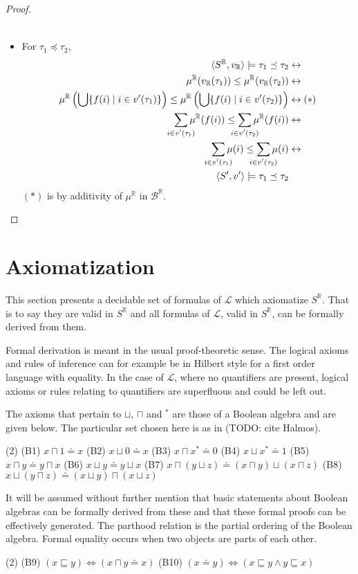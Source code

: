 \documentclass{article}
\newcommand{\R}{\mathbb{R}}
\newcommand{\B}{\mathcal{B}}
\newcommand{\lang}{\mathcal{L}}
\newcommand{\lcup}{\sqcup}
\newcommand{\lcap}{\sqcap}
\newcommand{\lstar}{^*}
\newcommand{\lpart}{\sqsubseteq}
\newcommand{\lparteq}{\doteq}
\newcommand{\lmeasure}{\preceq}
\begin{document}
\begin{proof}
\begin{itemize}
\begin{align*}
      \end{align*}
    \item For $\tau_1 \lmeasure \tau_2$,
      \begin{align*}
        \langle S^\R, v_\R \rangle \models \tau_1 \lmeasure \tau_2 &\leftrightarrow \\
        \mu^\R(v_\R(\tau_1)) \leq \mu^\R(v_\R(\tau_2)) &\leftrightarrow \\
        \mu^\R\left(\bigcup\{f(i) \mid i \in v'(\tau_1)\}\right) \leq \mu^\R\left(\bigcup\{f(i) \mid i \in v'(\tau_2)\}\right) &\leftrightarrow (*) \\
        \sum_{\mathclap{i \in v'(\tau_1)}}\mu^\R(f(i)) \leq \sum_{\mathclap{i \in v'(\tau_2)}}\mu^\R(f(i)) &\leftrightarrow \\
        \sum_{\mathclap{i \in v'(\tau_1)}}\mu(i) \leq \sum_{\mathclap{i \in v'(\tau_2)}}\mu(i) &\leftrightarrow \\
        \langle S', v' \rangle \models \tau_1 \lmeasure \tau_2
      \end{align*}
      $(*)$ is by additivity of $\mu^\R$ in $\B^\R$.
    \end{itemize}
\end{proof}
\section{Axiomatization}
This section presents a decidable set of formulas of $\lang$ which axiomatize $S^\R$. That is to say they are valid in $S^\R$ and all formulas of $\lang$, valid in $S^\R$, can be formally derived from them.

Formal derivation is meant in the usual proof-theoretic sense. The logical axioms and rules of inference can for example be in Hilbert style for a first order language with equality. In the case of $\lang$, where no quantifiers are present, logical axioms or rules relating to quantifiers are superfluous and could be left out.

The axioms that pertain to $\lcup$, $\lcap$ and $\lstar$ are those of a Boolean algebra and are given below. The particular set chosen here is as in (TODO: cite Halmos).
\begin{tasks}(2)
\task[] (B1) $x \lcap 1 \lparteq x$
\task[] (B2) $x \lcup 0 \lparteq x$
\task[] (B3) $x \lcap x\lstar \lparteq 0$
\task[] (B4) $x \lcup x\lstar \lparteq 1$
\task[] (B5) $x \lcap y \lparteq y \lcap x$
\task[] (B6) $x \lcup y \lparteq y \lcup x$
\task[] (B7) $x \lcap (y \lcup z) \lparteq (x \lcap y) \lcup (x \lcap z)$
\task[] (B8) $x \lcup (y \lcap z) \lparteq (x \lcup y) \lcap (x \lcup z)$
\end{tasks}
It will be assumed without further mention that basic statements about Boolean algebras can be formally derived from these and that these formal proofs can be effectively generated. The parthood relation is the partial ordering of the Boolean algebra. Formal equality occurs when two objects are parts of each other.
\begin{tasks}(2)
  \task[] (B9) $(x \lpart y) \Leftrightarrow (x \lcap y \lparteq x)$
  \task[] (B10) $(x \lparteq y) \Leftrightarrow (x \lpart y \land y \lpart x)$
\end{tasks}
\end{document}
